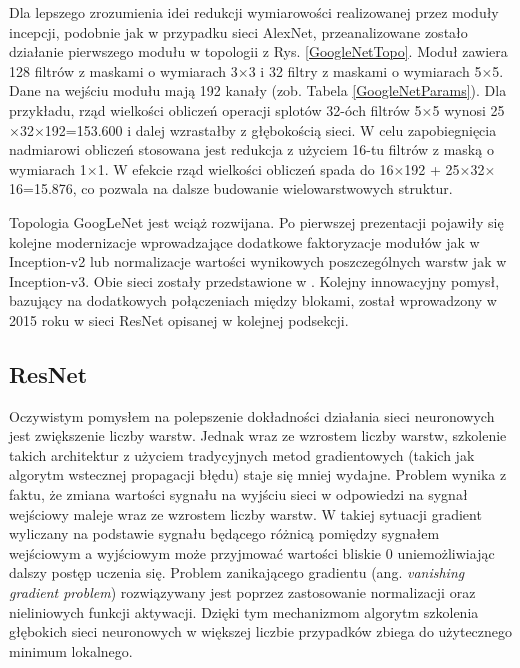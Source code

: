 Dla lepszego zrozumienia idei redukcji wymiarowości realizowanej przez moduły incepcji, podobnie jak w przypadku sieci AlexNet, przeanalizowane zostało działanie pierwszego modułu w topologii z Rys. \ref{GoogleNetTopo}.
Moduł zawiera 128 filtrów z maskami \linebreak o wymiarach 3$\times$3 i 32 filtry z maskami o wymiarach 5$\times$5. Dane na wejściu modułu mają 192 kanały (zob. Tabela \ref{GoogleNetParams}). Dla przykładu, rząd wielkości obliczeń operacji splotów 32-óch filtrów 5$\times$5 wynosi 25$\times$32$\times$192=153.600 i dalej wzrastałby z głębokością sieci. W celu zapobiegnięcia nadmiarowi obliczeń stosowana jest redukcja \linebreak z użyciem 16-tu filtrów z maską o wymiarach 1$\times$1. W efekcie rząd wielkości obliczeń spada do 16$\times$192 +  25$\times$32$\times$16=15.876, co pozwala na dalsze budowanie wielowarstwowych struktur.

Topologia GoogLeNet jest wciąż rozwijana. Po pierwszej prezentacji pojawiły się kolejne modernizacje wprowadzające dodatkowe faktoryzacje modułów jak w Inception-v2 lub normalizacje wartości wynikowych poszczególnych warstw jak \linebreak w Inception-v3. Obie sieci zostały przedstawione w \cite{DBLP:journals/corr/SzegedyVISW15}. Kolejny innowacyjny pomysł, bazujący na dodatkowych połączeniach między blokami, został wprowadzony w 2015 roku w sieci ResNet opisanej w kolejnej podsekcji.

\subsection{ResNet}
\label{resnet}
Oczywistym pomysłem na polepszenie dokładności działania sieci neuronowych jest zwiększenie liczby warstw. Jednak wraz ze wzrostem liczby warstw, szkolenie takich architektur z użyciem tradycyjnych metod gradientowych (takich jak algorytm wstecznej propagacji błędu) staje się mniej wydajne. Problem wynika z faktu, że zmiana wartości sygnału na wyjściu sieci w odpowiedzi na sygnał wejściowy maleje wraz ze wzrostem liczby warstw. W takiej sytuacji gradient wyliczany \linebreak na podstawie sygnału będącego różnicą pomiędzy sygnałem wejściowym a wyjściowym może przyjmować wartości bliskie 0 uniemożliwiając dalszy postęp uczenia się. Problem zanikającego gradientu (ang. \textit{vanishing gradient problem}) rozwiązywany jest poprzez zastosowanie normalizacji oraz nieliniowych funkcji aktywacji. Dzięki tym mechanizmom algorytm szkolenia głębokich sieci neuronowych w większej liczbie przypadków zbiega do użytecznego minimum lokalnego. 

